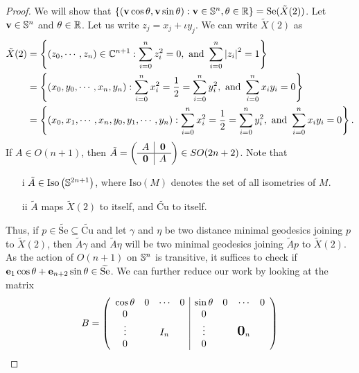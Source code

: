 \begin{proof}
	We will show that $\{(\mathbf{v}\cos \theta,\mathbf{v} \sin\theta):\mathbf{v}\in \mathbb{S}^n,\theta\in \mathbb{R}\} = \mathrm{Se}(\tilde{X}(2))$. Let $\mathbf{v}\in \mathbb{S}^n$ and $\theta\in \mathbb{R}$. Let us write $z_j=x_j+\iota y_j$. We can write $\tilde{X}(2)$ as
	\begin{align*}
		\tilde{X}(2) & = \left\{\left(z_0,\cdots,z_n\right)\in \mathbb{C}^{n+1}:\sum_{i=0}^n z_i^2=0,\text{ and } \sum_{i=0}^n\left|z_i\right|^2=1\right\} \\ 
		& = \left\{ \left(x_0,y_0,\cdots,x_n,y_n\right): \sum_{i=0}^nx_i^2=\frac{1}{2}=\sum_{i=0}^{n} y_i^2,\text{ and } \sum_{i=0}^{n} x_iy_i=0	\right\} \\
		& = \left\{ \left(x_0,x_1,\cdots,x_n,y_0,y_1,\cdots,y_n\right): \sum_{i=0}^nx_i^2=\frac{1}{2}=\sum_{i=0}^{n} y_i^2,\text{ and } \sum_{i=0}^{n} x_iy_i=0	\right\}.
	\end{align*}
	If $A\in O(n+1)$, then $\tilde{A}=\left(\begin{array}[]{c|c}
		A & \mathbf{0}   \\ \hline 
		\mathbf{0}  & A
	\end{array}\right)\in SO(2n+2)$. Note that
	\begin{enumerate}
		\item[i] $\tilde{A}\in \mathrm{Iso}\left(\mathbb{S}^{2n+1}\right)$, where $\mathrm{Iso}(M)$ denotes the set of all isometries of $M$. 
		\item[ii] $\tilde{A}$ maps $\tilde{X}(2)$  to itself, and $\widetilde{\mathrm{Cu}}$ to itself. 
	\end{enumerate}
	Thus, if $p\in \widetilde{\mathrm{Se}}\subseteq \widetilde{\mathrm{Cu}}$ and let $\gamma$ and $\eta$ be two distance minimal geodesics joining $p$ to $\tilde{X}(2)$, then $\tilde{A}\gamma$ and $\tilde{A}\eta$ will be two minimal geodesics joining $\tilde{A}p$ to $\tilde{X}(2)$. As the action of $O(n+1)$ on $\mathbb{S}^n$ is transitive, it suffices to check if $\mathbf{e} _1\cos\theta+\mathbf{e}_{n+2}\sin \theta\in \widetilde{\mathrm{Se}}$. We can further reduce our work by looking at the matrix 
	\begin{displaymath}
		B = 
		\begin{pmatrix}
			\begin{array}{cccc|cccc}
				\cos \theta  & 0 & \cdots & 0 & \sin \theta & 0 & \cdots & 0 
				\\
				0 &  &&   & 0 &  && 
				\\
				\vdots &  &I_n&   & \vdots &  &\mbox{\normalfont\Large\bfseries 0}_n& 
				\\
				0 &  &&   & 0 &  &&  

\end{array}
\end{pmatrix}
\end{displaymath}
\end{proof}
